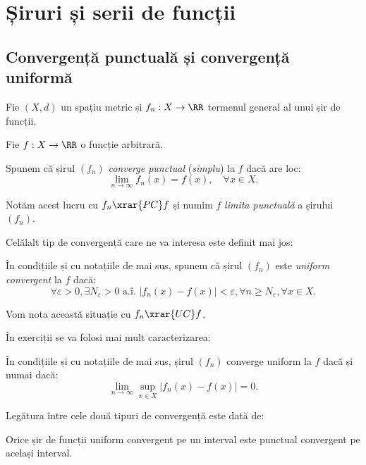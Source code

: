 \chapter{Șiruri și serii de funcții}

\section{Convergență punctuală și convergență uniformă}

\begin{definition}\label{def:conv-punct}
  Fie $(X, d) $ un spațiu metric și $ f_n : X \to \RR $ termenul general
  al unui șir de funcții.

  Fie $ f : X \to \RR $ o funcție arbitrară.

  Spunem că șirul $ (f_n) $ \emph{converge punctual} (\emph{simplu}) la $ f $
  dacă are loc:
  \[
    \lim_{n \to \infty} f_n(x) = f(x), \quad \forall x \in X.
  \]

  Notăm acest lucru cu $ f_n \xrar{PC} f $ și numim $ f $ \emph{limita punctuală}
  a șirului $ (f_n) $.
\end{definition}

Celălalt tip de convergență care ne va interesa este definit mai jos:
\begin{definition}\label{def:conv-unif}
  În condițiile și cu notațiile de mai sus, spunem că șirul $ (f_n) $ este
  \emph{uniform convergent} la $ f $ dacă:
  \[
    \forall \varepsilon > 0, \exists N_\varepsilon > 0 \text{ a.î. } %
    |f_n(x) - f(x)| < \varepsilon, \forall n \geq N_\varepsilon, \forall x \in X.
  \]

  Vom nota această situație cu $ f_n \xrar{UC} f $.
\end{definition}

În exerciții se va folosi mai mult caracterizarea:
\begin{proposition}\label{pr:conv-unif}
  În condițiile și cu notațiile de mai sus, șirul $(f_n)$ converge
  uniform la $ f $ dacă și numai dacă:
  \[
    \lim_{n \to \infty} \sup_{x \in X} |f_n(x) - f(x)| = 0.
  \]
\end{proposition}

Legătura între cele două tipuri de convergență este dată de:
\begin{theorem}\label{thm:UC-PC}
  Orice șir de funcții uniform convergent pe un interval este punctual
  convergent pe același interval.
\end{theorem}

